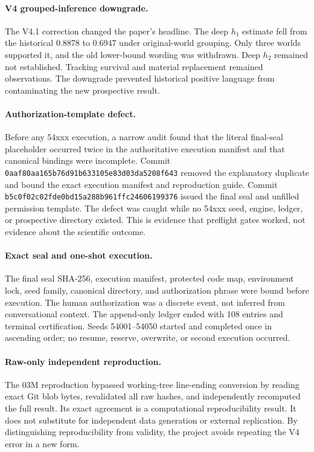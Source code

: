 \documentclass[11pt]{article}
\newcommand{\code}[1]{\texttt{#1}}
\begin{document}
\paragraph{V4 grouped-inference downgrade.}
The V4.1 correction changed the paper's headline. The deep $h_1$ estimate fell from the historical 0.8878 to 0.6947 under original-world grouping. Only three worlds supported it, and the old lower-bound wording was withdrawn. Deep $h_2$ remained not established. Tracking survival and material replacement remained observations. The downgrade prevented historical positive language from contaminating the new prospective result.

\paragraph{Authorization-template defect.}
Before any 54xxx execution, a narrow audit found that the literal final-seal placeholder occurred twice in the authoritative execution manifest and that canonical bindings were incomplete. Commit \code{0aaf80aa165b76d91b633105e83d03da5208f643} removed the explanatory duplicate and bound the exact execution manifest and reproduction guide. Commit \code{b5c0f02c02fde0bd15a288b961ffc24606199376} issued the final seal and unfilled permission template. The defect was caught while no 54xxx seed, engine, ledger, or prospective directory existed. This is evidence that preflight gates worked, not evidence about the scientific outcome.

\paragraph{Exact seal and one-shot execution.}
The final seal SHA-256, execution manifest, protected code map, environment lock, seed family, canonical directory, and authorization phrase were bound before execution. The human authorization was a discrete event, not inferred from conversational context. The append-only ledger ended with 108 entries and terminal certification. Seeds 54001--54050 started and completed once in ascending order; no resume, reserve, overwrite, or second execution occurred.

\paragraph{Raw-only independent reproduction.}
The 03M reproduction bypassed working-tree line-ending conversion by reading exact Git blob bytes, revalidated all raw hashes, and independently recomputed the full result. Its exact agreement is a computational reproducibility result. It does not substitute for independent data generation or external replication. By distinguishing reproducibility from validity, the project avoids repeating the V4 error in a new form.
\end{document}
